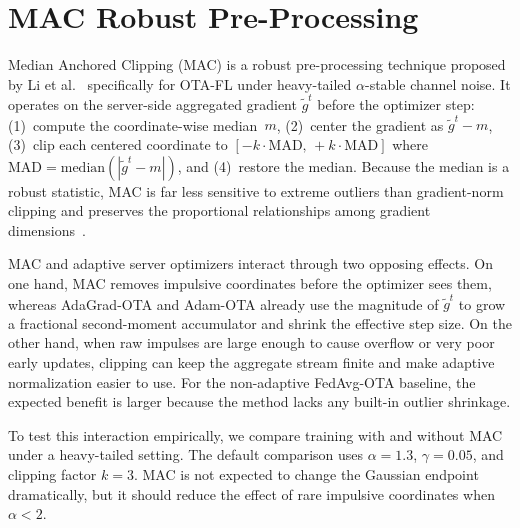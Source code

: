 \section{MAC Robust Pre-Processing}
Median Anchored Clipping (MAC) is a robust pre-processing technique
proposed by Li et al.~\cite{li2024robustmac} specifically for OTA-FL
under heavy-tailed $\alpha$-stable channel noise. It operates on the
server-side aggregated gradient $\tilde{g}^t$ before the optimizer step:
(1)~compute the coordinate-wise median~$m$, (2)~center the gradient
as $\tilde{g}^t - m$, (3)~clip each centered coordinate to
$[-k\cdot\mathrm{MAD},\,+k\cdot\mathrm{MAD}]$ where
$\mathrm{MAD}=\mathrm{median}(|\tilde{g}^t-m|)$, and (4)~restore the
median. Because the median is a robust statistic, MAC is far less
sensitive to extreme outliers than gradient-norm clipping and preserves
the proportional relationships among gradient
dimensions~\cite{li2024robustmac}.

MAC and adaptive server optimizers interact through two opposing effects.
On one hand, MAC removes impulsive coordinates before the optimizer sees
them, whereas AdaGrad-OTA and Adam-OTA already use the magnitude of
$\tilde{g}^t$ to grow a fractional second-moment accumulator and shrink the
effective step size. On the other hand, when raw impulses are large enough
to cause overflow or very poor early updates, clipping can keep the
aggregate stream finite and make adaptive normalization easier to use.
For the non-adaptive FedAvg-OTA baseline, the expected benefit is larger
because the method lacks any built-in outlier shrinkage.

To test this interaction empirically, we compare training with and without MAC
under a heavy-tailed setting. The default comparison uses
$\alpha=1.3$, $\gamma=0.05$, and clipping factor $k=3$. MAC is not expected
to change the Gaussian endpoint dramatically, but it should reduce the
effect of rare impulsive coordinates when $\alpha<2$.


